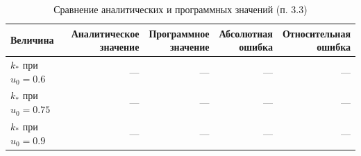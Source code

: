 \begin{table}[htbp]
\centering\footnotesize
\setlength{\tabcolsep}{4pt}
\caption{Сравнение аналитических и программных значений (п. 3.3)}
\label{tab:3-3-check}
\begin{tabular}{|l|r|r|r|r|}\hline
Величина & \shortstack{Аналитическое\\значение} & \shortstack{Программное\\значение} & \shortstack{Абсолютная\\ошибка} & \shortstack{Относительная\\ошибка}\\\hline
$k_*$ при $u_0=0.6$ & — & — & — & —\\
$k_*$ при $u_0=0.75$ & — & — & — & —\\
$k_*$ при $u_0=0.9$ & — & — & — & —\\
\hline\end{tabular}
\end{table}

